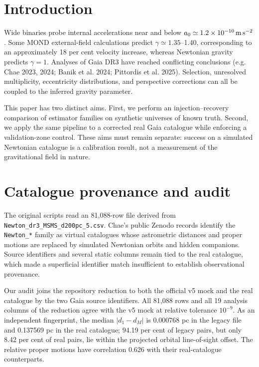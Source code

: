 \section{Introduction}
Wide binaries probe internal accelerations near and below
$a_0\simeq1.2\times10^{-10}\,{\rm m\,s^{-2}}$.  Some MOND external-field
calculations predict $\gamma\simeq1.35$--1.40, corresponding to an approximately
18 per cent velocity increase, whereas Newtonian gravity predicts $\gamma=1$.
Analyses of Gaia DR3 have reached conflicting conclusions (e.g. Chae 2023,
2024; Banik et al. 2024; Pittordis et al. 2025).  Selection, unresolved
multiplicity, eccentricity distributions, and perspective corrections can all
be coupled to the inferred gravity parameter.

This paper has two distinct aims.  First, we perform an injection--recovery
comparison of estimator families on synthetic universes of known truth.
Second, we apply the same pipeline to a corrected real Gaia catalogue while
enforcing a validation-zone control.  These aims must remain separate: success
on a simulated Newtonian catalogue is a calibration result, not a measurement
of the gravitational field in nature.

\section{Catalogue provenance and audit}
The original scripts read an 81,088-row file derived from
\texttt{Newton\_dr3\_MSMS\_d200pc\_5.csv}.  Chae's public Zenodo records
identify the \texttt{Newton\_*} family as virtual catalogues whose astrometric
distances and proper motions are replaced by simulated Newtonian orbits and
hidden companions.  Source identifiers and several static columns remain tied
to the real catalogue, which made a superficial identifier match insufficient
to establish observational provenance.

Our audit joins the repository reduction to both the official v5 mock and the
real catalogue by the two Gaia source identifiers.  All 81,088 rows and all 19
analysis columns of the reduction agree with the v5 mock at relative tolerance
$10^{-9}$.  As an independent fingerprint, the median
$|d_1-d_M|$ is 0.000768 pc in the legacy file and 0.137569 pc in the real
catalogue; 94.19 per cent of legacy pairs, but only 8.42 per cent of real pairs,
lie within the projected orbital line-of-sight offset.  The relative proper
motions have correlation 0.626 with their real-catalogue counterparts.


